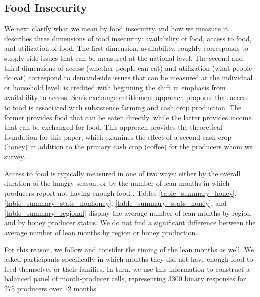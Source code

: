 \documentclass[../main.tex]{subfiles}
\begin{document}
\subsection{Food Insecurity}
\label{food_insecurity}
We next clarify what we mean by food insecurity and how we measure it. \textcite{barrettMeasuringFoodInsecurity2010} describes three dimensions of food insecurity: availability of food, access to food, and utilization of food. The first dimension, availability, roughly corresponds to supply-side issues that can be measured at the national level. The second and third dimensions of access (whether people can eat) and utilization (what people do eat) correspond to demand-side issues that can be measured at the individual or household level. \textcite{senPovertyFaminesEssay1982} is credited
with beginning the shift in emphasis from availability to access. Sen's exchange entitlement approach proposes that access to food is associated with subsistence farming and cash crop production. The former provides food that can be eaten directly, while the latter provides income that can be exchanged for food. This approach provides the theoretical foundation for this paper, which examines the effect of a second cash crop (honey) in addition to the primary cash crop (coffee) for the producers whom we survey. 

Access to food is typically measured in one of two ways:
either by the overall duration of the hungry season,
or by the number of lean months in which producers report
not having enough food
\parencite{baconExplainingHungryFarmer2014, bellemareContractFarmingFood2017, anderzenEffectsOnfarmDiversification2020}.
Tables \ref{table_summary_honey}, \ref{table_summary_stats_nonhoney}, \ref{table_summary_stats_honey}, and
\ref{table_summary_regional} display
the average number of lean months by region and by honey producer status. We do not find a significant difference between the average number of lean months by region or honey production.

For this reason, we follow \textcite{morrisMesesFlacosSeasonal2013}
and consider the timing of the lean months as well. We asked participants specifically in which months they did not have enough
food to feed themselves or their families. In turn, we use this information to construct a balanced panel of month-producer cells, representing 3300 binary responses for 275 producers over 12 months.  
\end{document}

